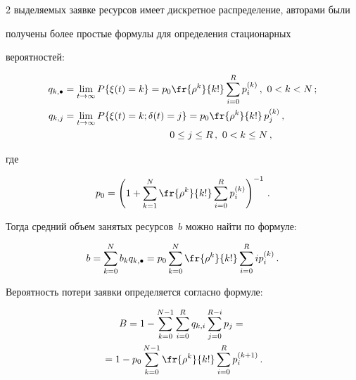 \begin{multicols}{2}
выделяемых заявке ресурсов имеет дискретное распределение, авторами были 

получены более простые формулы для определения стационарных 

вероятностей:

  \begin{align*}

  q_{k,\bullet} &=\lim\limits_{t\to\infty} P\{ \xi(t)=k\} = p_0

\fr{\rho^k}{k!}\sum\limits_{i=0}^R p_i^{(k)}\,,\ 0<k<N\,;\\

  q_{k,j} &=\lim\limits_{t\to\infty} P\{\xi(t)=k;\delta(t)=j\} = p_0 \fr{\rho^k}{k!}\, 

p_j^{(k)}\,,\\

& \hspace*{38mm}0\leq j\leq R\,,\ 0<k\leq N\,,

  \end{align*}

где 

$$

p_0 = \left( 1+\sum\limits_{k=1}^N \fr{\rho^k}{k!} \sum\limits_{i=0}^R 

p_i^{(k)}\right)^{-1}\,.

$$



  Тогда средний объем занятых ресурсов~$b$ можно найти по формуле:

  \begin{equation}

  b=\sum\limits_{k=0}^N b_k q_{k,\bullet} = p_0\sum\limits_{k=0}^N 

\fr{\rho^k}{k!} \sum\limits_{i=0}^R i p_i^{(k)}\,.

  \label{e11-v}

  \end{equation}

  

  Вероятность потери заявки определяется согласно формуле: 

  \begin{multline}

  B=1-\sum\limits_{k=0}^{N-1} \sum\limits_{i=0}^R q_{k,i} 

\sum\limits_{j=0}^{R-i} p_j={}\\

{}=1-p_0 \sum\limits_{k=0}^{N-1} \fr{\rho^k}{k!} 

\sum\limits_{i=0}^R p_i^{(k+1)}\,.


\end{multline}
\end{multicols}
